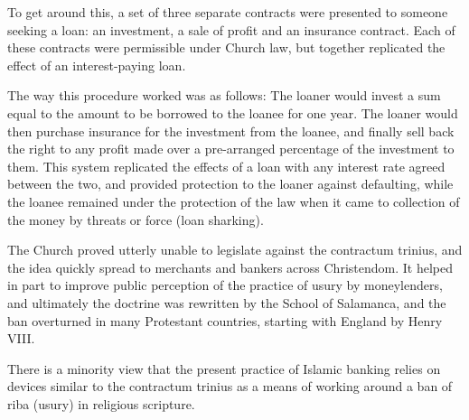 To get around this, a set of three separate contracts were presented to someone seeking a loan: an investment, a sale of profit and an insurance contract. Each of these contracts were permissible under Church law, but together replicated the effect of an interest-paying loan.

The way this procedure worked was as follows: The loaner would invest a sum equal to the amount to be borrowed to the loanee for one year. The loaner would then purchase insurance for the investment from the loanee, and finally sell back the right to any profit made over a pre-arranged percentage of the investment to them. This system replicated the effects of a loan with any interest rate agreed between the two, and provided protection to the loaner against defaulting, while the loanee remained under the protection of the law when it came to collection of the money by threats or force (loan sharking).

The Church proved utterly unable to legislate against the contractum trinius, and the idea quickly spread to merchants and bankers across Christendom. It helped in part to improve public perception of the practice of usury by moneylenders, and ultimately the doctrine was rewritten by the School of Salamanca, and the ban overturned in many Protestant countries, starting with England by Henry VIII.

There is a minority view that the present practice of Islamic banking relies on devices similar to the contractum trinius as a means of working around a ban of riba (usury) in religious scripture.

